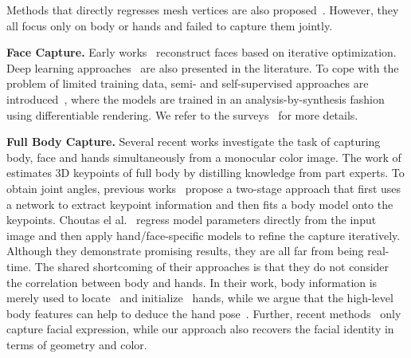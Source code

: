 \documentclass[final]{cvpr}
\begin{document}
Methods that directly regresses mesh vertices are also proposed~\cite{moon2020deephandmesh,ge20193d,baek2020weakly}.
However, they all focus only on body or hands and failed to capture them jointly.
\par
\noindent \textbf{Face Capture.}
Early works~\cite{romdhani2005estimating,garrido2016reconstruction,thies2016face2face,wang2020emotion} reconstruct faces based on iterative optimization.
Deep learning approaches~\cite{richardson2017learning,tuan2017regressing} are also presented in the literature.
To cope with the problem of limited training data, semi- and self-supervised approaches are introduced~\cite{tewari2017mofa,tewari2018self,sengupta2018sfsnet,tewari2019fml}, where the models are trained in an analysis-by-synthesis fashion using differentiable rendering.
We refer to the surveys~\cite{zollhofer2018state,egger20203d} for more details.
\par
\noindent \textbf{Full Body Capture.}
Several recent works investigate the task of capturing body, face and hands simultaneously from a monocular color image.
The work of \cite{dope} estimates 3D keypoints of full body by distilling knowledge from part experts.
To obtain joint angles, previous works~\cite{xiang2019monocular,pavlakos2019expressive} propose a two-stage approach that first uses a network to extract keypoint information and then fits a body model onto the keypoints.
Choutas el al.~\cite{choutas2020monocular} regress model parameters directly from the input image and then apply hand/face-specific models to refine the capture iteratively.
Although they demonstrate promising results, they are all far from being real-time.
The shared shortcoming of their approaches is that they do not consider the correlation between body and hands.
In their work, body information is merely used to locate~\cite{xiang2019monocular,choutas2020monocular,pavlakos2019expressive} and initialize~\cite{choutas2020monocular} hands, while we argue that the high-level body features can help to deduce the hand pose~\cite{ng2020body2hands}.
Further, recent methods~\cite{xiang2019monocular,pavlakos2019expressive,choutas2020monocular} only capture facial expression, while our approach also recovers the facial identity in terms of geometry and color.
\end{document}
